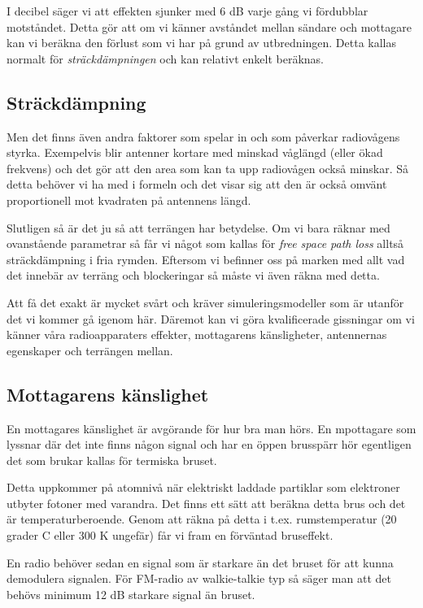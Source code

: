 I decibel säger vi att effekten sjunker med 6 dB varje gång vi fördubblar motståndet. Detta gör att om vi känner avståndet mellan sändare och mottagare kan vi beräkna den förlust som vi har på grund av utbredningen. Detta kallas normalt för \textit{sträckdämpningen} och kan relativt enkelt beräknas.

\subsection{Sträckdämpning}

Men det finns även andra faktorer som spelar in och som påverkar radiovågens styrka. Exempelvis blir antenner kortare med minskad våglängd (eller ökad frekvens) och det gör att den area som kan ta upp radiovågen också minskar. Så detta behöver vi ha med i formeln och det visar sig att den är också omvänt proportionell mot kvadraten på antennens längd.

Slutligen så är det ju så att terrängen har betydelse. Om vi bara räknar med ovanstående parametrar så får vi något som kallas för \textit{free space path loss} alltså sträckdämpning i fria rymden. Eftersom vi befinner oss på marken med allt vad det innebär av terräng och blockeringar så måste vi även räkna med detta.

Att få det exakt är mycket svårt och kräver simuleringsmodeller som är utanför det vi kommer gå igenom här. Däremot kan vi göra kvalificerade gissningar om vi känner våra radioapparaters effekter, mottagarens känsligheter, antennernas egenskaper och terrängen mellan.

\subsection{Mottagarens känslighet}

En mottagares känslighet är avgörande för hur bra man hörs. En mpottagare som lyssnar där det inte finns någon signal och har en öppen brusspärr hör egentligen det som brukar kallas för termiska bruset.

Detta uppkommer på atomnivå när elektriskt laddade partiklar som elektroner utbyter fotoner med varandra. Det finns ett sätt att beräkna detta brus och det är temperaturberoende. Genom att räkna på detta i t.ex. rumstemperatur (20 grader C eller 300 K ungefär) får vi fram en förväntad bruseffekt.

En radio behöver sedan en signal som är starkare än det bruset för att kunna demodulera signalen. För FM-radio av walkie-talkie typ så säger man att det behövs minimum 12 dB starkare signal än bruset.

